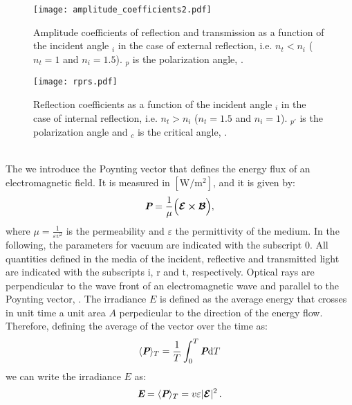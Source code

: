 \begin{figure}[h]
  \begin{minipage}[h]{0.4\textwidth}
    \texttt{[image: amplitude\_coefficients2.pdf]}
    \caption{Amplitude coefficients of reflection and transmission as a function of the incident angle \myangle$_i$  in the case of external reflection, i.e. $n_t<n_i$
($n_t = 1$ and $n_i=1.5$). \myangle$_p$ is the polarization angle, \cite{hecht1998hecht}.}
    \label{fig:coefficients}
  \end{minipage} \hspace{2.5cm}
  \begin{minipage}[h]{0.4\textwidth}
    \texttt{[image: rprs.pdf]}
    \caption{Reflection coefficients as a function of the incident angle \myangle$_i$ in the case of internal reflection, i.e. $n_t>n_i$
($n_t = 1.5$ and $n_i=1$). \myangle$_{p\prime}$ is the polarization angle and \myangle$_c$ is the critical angle, \cite{hecht1998hecht}.}
   \label{fig:coefficients2}
 \end{minipage}
\end{figure}\\
\indent The  we introduce the Poynting vector  that defines the energy flux of an electromagnetic field. 
It is measured in $[\textrm{W}/\textrm{m}^2]$, and it is given by:
\begin{equation}
\textit{\textbf{P}} = \frac{1}{\mu}\Big(\boldsymbol{\mathcal{E}}\boldsymbol{\times} \boldsymbol{\mathcal{B}}\Big),
\end{equation}
where $\mu = \frac{1}{\varepsilon v^2}$ is the permeability and $\varepsilon$ the permittivity of the medium.
 In the following, the parameters for vacuum are indicated with the subscript $0$. All quantities defined in the media of the incident, reflective and transmitted light are indicated with the subscripts \textrm{i}, \textrm{r} and \textrm{t}, respectively. Optical rays are perpendicular to the wave front of an electromagnetic wave and parallel to the Poynting vector, \cite{jones2015optical}.
The irradiance $E$ is defined as the average energy that crosses in unit time a unit area $A$ perpedicular to the direction of the energy flow.
Therefore, defining the average of the vector  over the time as:
\begin{equation}
\langle \textit{\textbf{P}} \rangle_T = \frac{1}{T}\int_0^T \textit{\textbf{P}}\textrm{d}T
\end{equation}
we can write the irradiance $E$ as:
\begin{equation}
\textit{\textbf{E}} = \langle\textit{\textbf{P}}\rangle_{T} = v\varepsilon|\boldsymbol{\mathcal{E}}|^2 \,.
\end{equation}
